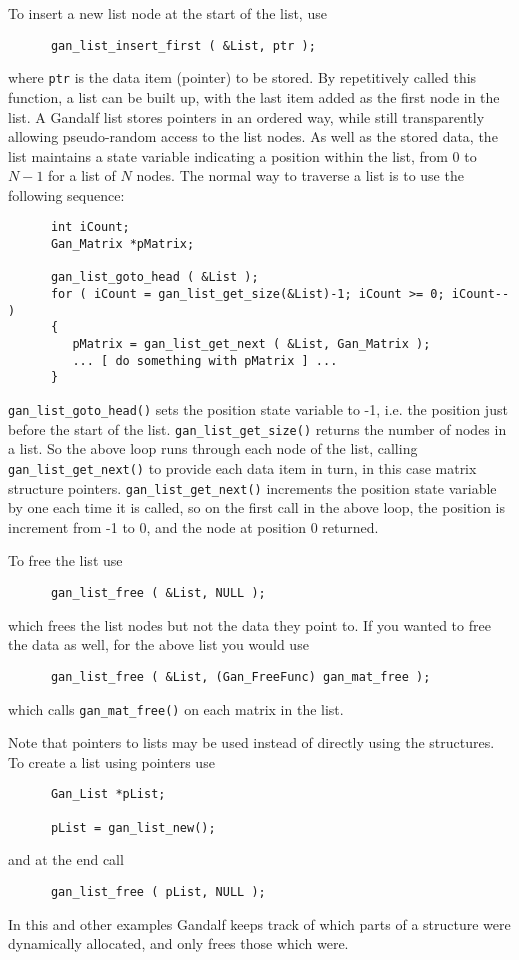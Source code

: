 To insert a new list node at the start of the list, use
\begin{verbatim}
      gan_list_insert_first ( &List, ptr );
\end{verbatim}
where {\tt ptr} is the data item (pointer) to be stored. By repetitively
called this function, a list can be built up, with the last item added as
the first node in the list.
A Gandalf list stores pointers in an ordered way, while still transparently
allowing pseudo-random access to the list nodes. As well as the stored
data, the list maintains a state variable indicating a position within the
list, from 0 to $N-1$ for a list of $N$ nodes. The normal way to traverse
a list is to use the following sequence:
\begin{verbatim}
      int iCount;
      Gan_Matrix *pMatrix;

      gan_list_goto_head ( &List );
      for ( iCount = gan_list_get_size(&List)-1; iCount >= 0; iCount-- )
      {
         pMatrix = gan_list_get_next ( &List, Gan_Matrix );
         ... [ do something with pMatrix ] ...
      }
\end{verbatim}
{\tt gan\_list\_goto\_head()} sets the position state variable to -1,
i.e. the position just before the start of the list.
{\tt gan\_list\_get\_size()} returns the number of nodes in a list.
So the above loop runs through each node of the list, calling
{\tt gan\_list\_get\_next()} to provide each data item in turn, in this
case matrix structure pointers. {\tt gan\_list\_get\_next()} increments
the position state variable by one each time it is called, so on the
first call in the above loop, the position is increment from -1 to 0,
and the node at position 0 returned.

To free the list use
\begin{verbatim}
      gan_list_free ( &List, NULL );
\end{verbatim}
which frees the list nodes but not the data they point to. If you wanted to
free the data as well, for the above list you would use
\begin{verbatim}
      gan_list_free ( &List, (Gan_FreeFunc) gan_mat_free );
\end{verbatim}
which calls {\tt gan\_mat\_free()} on each matrix in the list.

Note that pointers to lists may be used instead of directly using the
structures. To create a list using pointers use
\begin{verbatim}
      Gan_List *pList;

      pList = gan_list_new();
\end{verbatim}
and at the end call
\begin{verbatim}
      gan_list_free ( pList, NULL );
\end{verbatim}
In this and other examples Gandalf keeps track of which parts of a structure
were dynamically allocated, and only frees those which were.


